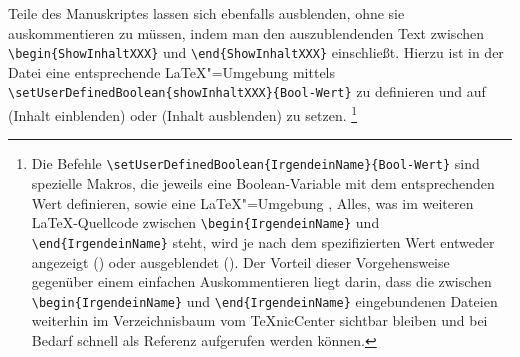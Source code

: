 \begin{showExamples}
Teile des Manuskriptes lassen sich ebenfalls ausblenden, ohne sie auskommentieren zu müssen,
indem man den auszublendenden Text zwischen
\lstinline|\begin{ShowInhaltXXX}| und \lstinline|\end{ShowInhaltXXX}| einschließt.
Hierzu ist in der Datei 
eine entsprechende \LaTeX{}"=Umgebung mittels
\lstinline|\setUserDefinedBoolean{showInhaltXXX}{Bool-Wert}| zu definieren und
auf  (Inhalt einblenden) 
oder  (Inhalt ausblenden) zu setzen.%
%
\footnote{Die Befehle
\lstinline|\setUserDefinedBoolean{IrgendeinName}{Bool-Wert}| 
sind spezielle Makros, die jeweils eine Boolean-Variable mit dem entsprechenden Wert definieren,
sowie eine \LaTeX"=Umgebung ,
Alles, was im weiteren \LaTeX-Quellcode zwischen
\lstinline|\begin{IrgendeinName}| und \lstinline|\end{IrgendeinName}| steht,
wird je nach dem spezifizierten Wert entweder angezeigt () 
oder ausgeblendet ().
Der Vorteil dieser Vorgehensweise gegenüber einem einfachen Auskommentieren 
liegt \ua darin, dass die zwischen
\lstinline|\begin{IrgendeinName}| und \lstinline|\end{IrgendeinName}|
eingebundenen Dateien weiterhin im Verzeichnisbaum vom TeXnicCenter \etc
sichtbar bleiben und bei Bedarf schnell als Referenz aufgerufen werden können.}
%
%
%

















%
\end{showExamples}%